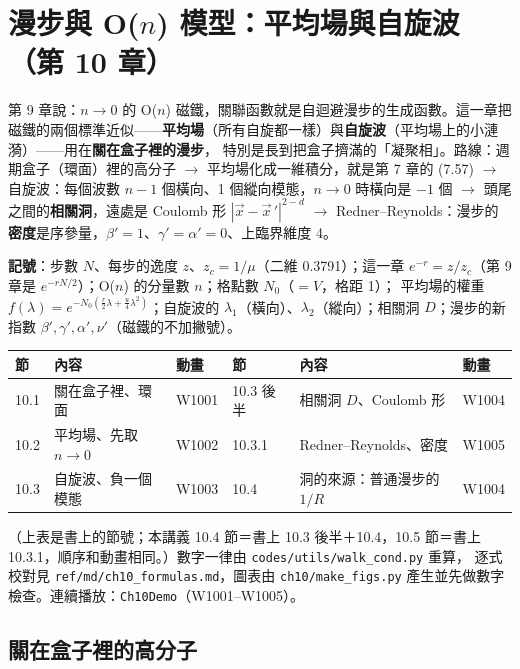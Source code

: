 

\section{漫步與 \texorpdfstring{O($n$)}{O(n)} 模型：平均場與自旋波（第 10 章）}

\begin{keybox}[先看這裡]
第 9 章說：$n\to0$ 的 O($n$) 磁鐵，關聯函數就是自迴避漫步的生成函數。這一章把磁鐵的兩個標準近似——\textbf{平均場}（所有自旋都一樣）與\textbf{自旋波}（平均場上的小漣漪）——用在\textbf{關在盒子裡的漫步}，
特別是長到把盒子擠滿的「凝聚相」。路線：週期盒子（環面）裡的高分子 $\to$ 平均場化成一維積分，就是第 7 章的 (7.57) $\to$ 自旋波：每個波數 $n-1$ 個橫向、1 個縱向模態，$n\to0$ 時橫向是 $-1$ 個
$\to$ 頭尾之間的\textbf{相關洞}，遠處是 Coulomb 形 $|\vec x-\vec x\,'|^{2-d}$ $\to$ Redner--Reynolds：漫步的\textbf{密度}是序參量，$\beta'=1$、$\gamma'=\alpha'=0$、上臨界維度 4。

\textbf{記號}：步數 $N$、每步的逸度 $z$、$z_c=1/\mu$（二維 0.3791）；這一章 $e^{-r}=z/z_c$（第 9 章是 $e^{-rN/2}$）；O($n$) 的分量數 $n$；格點數 $N_0$（$=V$，格距 1）；
平均場的權重 $f(\lambda)=e^{-N_0(\frac r2\lambda+\frac u4\lambda^2)}$；自旋波的 $\lambda_1$（橫向）、$\lambda_2$（縱向）；相關洞 $D$；漫步的新指數 $\beta',\gamma',\alpha',\nu'$（磁鐵的不加撇號）。
\begin{center}
\small
\begin{tabular}{@{}lll@{\qquad}lll@{}}
\toprule
節 & 內容 & 動畫 & 節 & 內容 & 動畫\\
\midrule
10.1 & 關在盒子裡、環面 & W1001 & 10.3 後半 & 相關洞 $D$、Coulomb 形 & W1004\\
10.2 & 平均場、先取 $n\to0$ & W1002 & 10.3.1 & Redner--Reynolds、密度 & W1005\\
10.3 & 自旋波、負一個模態 & W1003 & 10.4 & 洞的來源：普通漫步的 $1/R$ & W1004\\
\bottomrule
\end{tabular}
\end{center}
（上表是書上的節號；本講義 10.4 節＝書上 10.3 後半＋10.4，10.5 節＝書上 10.3.1，順序和動畫相同。）數字一律由 \texttt{codes/utils/walk\_cond.py} 重算，
逐式校對見 \texttt{ref/md/ch10\_formulas.md}，圖表由 \texttt{ch10/make\_figs.py} 產生並先做數字檢查。連續播放：\texttt{Ch10Demo}（W1001--W1005）。
\end{keybox}

\subsection{關在盒子裡的高分子}
\leavevmode{}\ \par\nopagebreak

